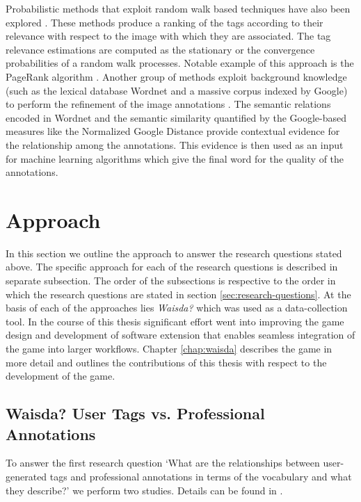 Probabilistic methods that exploit random walk based techniques have also been explored \cite{Wang:2006:IAR:1180639.1180774,Liu:2009:TR:1526709.1526757,Li:2012:TRP:2382336.2382380}. These methods produce a ranking of the tags according to their relevance with respect to the image with which they are associated. The tag relevance estimations are computed as the stationary or the convergence probabilities of  a random walk processes. Notable example of this approach is the PageRank algorithm \cite{journals/corr/abs-1012-4872,10.4137/GRSB.S702,junker2008analysis}. Another group of methods exploit background knowledge (such as the lexical database Wordnet and a massive corpus indexed by Google) to perform the refinement of the image annotations \cite{Jin:2010:KBI:1731523.1731529,Wang:2007:RIA:1282280.1282343}. The semantic relations encoded in Wordnet and the semantic similarity quantified by the Google-based measures like the Normalized Google Distance \cite{DBLP:journals/corr/abs-cs-0412098} provide contextual evidence for the relationship among the annotations. This evidence is then used as an input for machine learning algorithms which give the final word for the quality of the annotations.

\section{Approach}
In this section we outline the approach to answer the research questions stated above. The specific approach for each of the research questions is described in separate subsection. The order of the subsections is respective to the order in which the research questions are stated in section \ref{sec:research-questions}. At the basis of each of the approaches lies \textit{Waisda?} which was used as a data-collection tool. In the course of this thesis significant effort went into improving the game design and development of software extension that enables seamless integration of the game into larger workflows. Chapter \ref{chap:waisda} describes the game in more detail and outlines the contributions of this thesis with respect to the development of the game.

\subsection{Waisda? User Tags vs. Professional Annotations}\label{sec:user-professional}
To answer the first research question `What are the relationships between user-generated tags  and professional annotations in terms of the vocabulary and what they describe?' we perform two studies. Details can be found in \cite{websciencepaper,kcap}.

